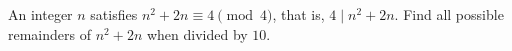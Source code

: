 An integer $n$ satisfies $n^2+2n\equiv4\pmod4$, that is, $4\mid n^2+2n$. Find all possible remainders of $n^2+2n$ when divided by $10$.
